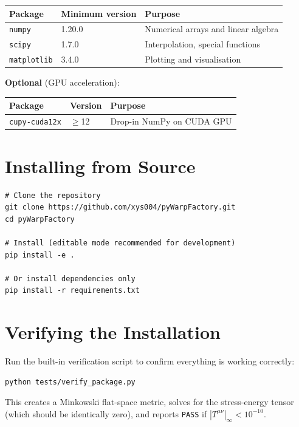 \documentclass[11pt, a4paper, twoside]{report}
\begin{document}
\begin{center}
\begin{tabular}{lll}
  \toprule
  Package & Minimum version & Purpose \\
  \midrule
  \texttt{numpy}      & 1.20.0 & Numerical arrays and linear algebra \\
  \texttt{scipy}      & 1.7.0  & Interpolation, special functions \\
  \texttt{matplotlib} & 3.4.0  & Plotting and visualisation \\
  \bottomrule
\end{tabular}
\end{center}

\textbf{Optional} (GPU acceleration):
\begin{center}
\begin{tabular}{lll}
  \toprule
  Package & Version & Purpose \\
  \midrule
  \texttt{cupy-cuda12x} & $\ge$12 & Drop-in NumPy on CUDA GPU \\
  \bottomrule
\end{tabular}
\end{center}

\section{Installing from Source}

\begin{lstlisting}[caption={Installation from GitHub}]
# Clone the repository
git clone https://github.com/xys004/pyWarpFactory.git
cd pyWarpFactory

# Install (editable mode recommended for development)
pip install -e .

# Or install dependencies only
pip install -r requirements.txt
\end{lstlisting}

\section{Verifying the Installation}

Run the built-in verification script to confirm everything is working
correctly:

\begin{lstlisting}[caption={Package verification}]
python tests/verify_package.py
\end{lstlisting}

This creates a Minkowski flat-space metric, solves for the stress-energy
tensor (which should be identically zero), and reports \texttt{PASS} if
$|T^{\mu\nu}|_\infty < 10^{-10}$.
\end{document}
